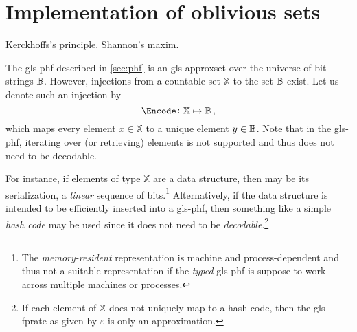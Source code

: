 \documentclass[ ../main.tex]{subfiles}
\begin{document}
\section{Implementation of oblivious sets}
Kerckhoffs's principle. Shannon's maxim.

The \gls{gls-phf} described in \cref{sec:phf} is an \gls{gls-approxset} over the universe of bit strings $\mathbb{B}$. However, injections from a countable set $\mathbb{X}$ to the set $\mathbb{B}$ exist. Let us denote such an injection by
\begin{equation}
    \Encode \colon \mathbb{X} \mapsto \cisb\,,
\end{equation}
which maps every element $x \in \mathbb{X}$ to a unique element $y \in \mathbb{B}$. Note that in the \gls{gls-phf}, iterating over (or retrieving) elements is not supported and thus \Encode does not need to be decodable.

For instance, if elements of type $\mathbb{X}$ are a data structure, then \Encode may be its serialization, a \emph{linear} sequence of bits.\footnote{The \emph{memory-resident} representation is machine and process-dependent and thus not a suitable representation if the \emph{typed} \gls{gls-phf} is suppose to work across multiple machines or processes.} Alternatively, if the data structure is intended to be efficiently inserted into a \gls{gls-phf}, then something like a simple \emph{hash code} may be used since it does not need to be \emph{decodable}.\footnote{If each element of $\mathbb{X}$ does not uniquely map to a hash code, then the \gls{gls-fprate} as given by $\varepsilon$ is only an approximation.}
\end{document}
